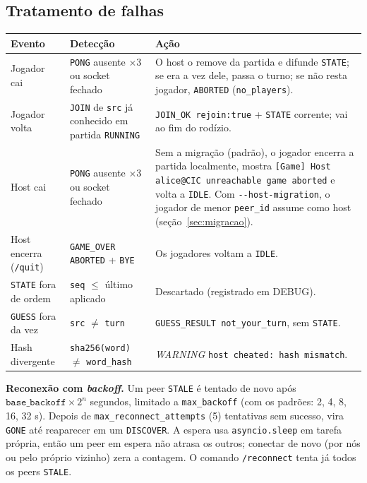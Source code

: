 \documentclass[11pt,a4paper]{article}
\begin{document}
\subsection{Tratamento de falhas}
\begin{tabularx}{\textwidth}{@{}P{3.2cm}P{4.4cm}Y@{}}
\toprule
\textbf{Evento} & \textbf{Detecção} & \textbf{Ação}\\
\midrule
Jogador cai & \texttt{PONG} ausente $\times$3 ou socket fechado & O host o remove da partida e difunde \texttt{STATE}; se era a vez dele, passa o turno; se não resta jogador, \texttt{ABORTED} (\texttt{no\_players}).\\
Jogador volta & \texttt{JOIN} de \texttt{src} já conhecido em partida \texttt{RUNNING} & \texttt{JOIN\_OK rejoin:true} + \texttt{STATE} corrente; vai ao fim do rodízio.\\
Host cai & \texttt{PONG} ausente $\times$3 ou socket fechado & Sem a migração (padrão), o jogador encerra a partida localmente, mostra \texttt{[Game] Host alice@CIC unreachable \textemdash{} game aborted} e volta a \texttt{IDLE}. Com \texttt{-{}-host-migration}, o jogador de menor \texttt{peer\_id} assume como host (seção~\ref{sec:migracao}).\\
Host encerra (\texttt{/quit}) & \texttt{GAME\_OVER ABORTED} + \texttt{BYE} & Os jogadores voltam a \texttt{IDLE}.\\
\texttt{STATE} fora de ordem & \texttt{seq} $\le$ último aplicado & Descartado (registrado em DEBUG).\\
\texttt{GUESS} fora da vez & \texttt{src} $\ne$ \texttt{turn} & \texttt{GUESS\_RESULT not\_your\_turn}, sem \texttt{STATE}.\\
Hash divergente & \texttt{sha256(word)} $\ne$ \texttt{word\_hash} & \emph{WARNING} \texttt{host cheated: hash mismatch}.\\
\bottomrule
\end{tabularx}

\textbf{Reconexão com \emph{backoff}.} Um peer \texttt{STALE} é tentado de novo após $\mathtt{base\_backoff} \times 2^n$ segundos, limitado a \texttt{max\_backoff} (com os padrões: 2, 4, 8, 16, 32 s). Depois de \texttt{max\_reconnect\_attempts} (5) tentativas sem sucesso, vira \texttt{GONE} até reaparecer em um \texttt{DISCOVER}. A espera usa \texttt{asyncio.sleep} em tarefa própria, então um peer em espera não atrasa os outros; conectar de novo (por nós ou pelo próprio vizinho) zera a contagem. O comando \texttt{/reconnect} tenta já todos os peers \texttt{STALE}.
\end{document}
